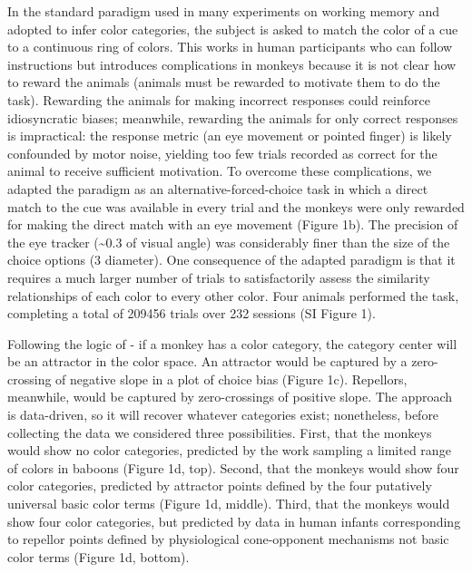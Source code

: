 \documentclass[9pt,biorxiv,lineno,onehalfspacing]{lapreprint}
\begin{document}
\begin{refsection}
In the standard paradigm used in many experiments on working memory and adopted to infer color categories, the subject is asked to match the color of a cue to a continuous ring of colors. This works in human participants who can follow instructions but introduces complications in monkeys because it is not clear how to reward the animals (animals must be rewarded to motivate them to do the task). Rewarding the animals for making incorrect responses could reinforce idiosyncratic biases; meanwhile, rewarding the animals for only correct responses is impractical: the response metric (an eye movement or pointed finger) is likely confounded by motor noise, yielding too few trials recorded as correct for the animal to receive sufficient motivation. To overcome these complications, we adapted the paradigm as an alternative-forced-choice task in which a direct match to the cue was available in every trial and the monkeys were only rewarded for making the direct match with an eye movement (Figure 1b). 
The precision of the eye tracker (\textasciitilde0.3\degree{} of visual angle) was considerably finer than the size of the choice options (3\degree{} diameter). 
One consequence of the adapted paradigm is that it requires a much larger number of trials to satisfactorily assess the similarity relationships of each color to every other color. 
Four animals performed the task, completing a total of 209456 trials over 232 sessions (SI Figure 1).

Following the logic of \citet{bae_why_2015} - if a monkey has a color category, the category center will be an attractor in the color space. 
An attractor would be captured by a zero-crossing of negative slope in a plot of choice bias (Figure 1c). 
Repellors, meanwhile, would be captured by zero-crossings of positive slope. 
The approach is data-driven, so it will recover whatever categories exist; nonetheless, before collecting the data we considered three possibilities. 
First, that the monkeys would show no color categories, predicted by the work sampling a limited range of colors in baboons \citep{davidoff_cross-species_2010} (Figure 1d, top). 
Second, that the monkeys would show four color categories, predicted by attractor points defined by the four putatively universal basic color terms (Figure 1d, middle). 
Third, that the monkeys would show four color categories, but predicted by data in human infants corresponding to repellor points defined by physiological cone-opponent mechanisms not basic color terms \citep{skelton_biological_2017} (Figure 1d, bottom).


\end{refsection}
\end{document}
